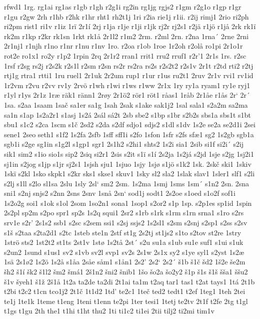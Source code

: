 rfwd1
1rg.
rg1ai
rg1as
r1gb
r1gh
r2g1i
rg2in
rg1jg
rgjs2
r1gm
r2g1o
r1gp
r1gr
r1gu
r2gw
2rh
r1hb
r2hk
r1hr
rht1
rh2t1j
1ri
r2ia
rie1j
r1ii.
r2ij
rimj1
2rio
ri2ph
ri2pm
rist1
ri1v
r1iz
1rï
2r1í
2rj
r1ja
r1je
r1ji
r1jk
rj2r
rj2s1
r2jä
r1jö
r1jå
2rk
rk1ï
rk2m
r1kp
r2kr
rk1sn
1rkt
rk1å
2r1l2
r1m2
2rm.
r2ml
2rn.
r2na
1rna´
2rne
2rni
2r1nj1
r1njh
r1no
r1nr
r1nu
r1nv
1ro.
r2oa
r1ob
1roe
1r2oh
r2olå
ro1pi
2r1o1r
rot2e
ro1x1
ro2y
r1p2
1rpin
2rq
2r1r2
rran1
rrit1
rru2
rruf1
r2r'1
2r1s
1rs.
r2sc
1rsf
r2sg
rs2j
r2s2k
r2s1l
r2sm
r2sn
rs2r
rs2ra
rs2s
r2s2t2
r2s1v
2r1t
r2td
rti2
r2tj
rtj1g
rtra1
rtti1
1ru
ruel1
2r1uk
2r2um
rup1
r1ur
r1us
ru2t1
2ruv
2r1v
rvi1
rv1id
1r2vm
r2vu
r2vv
rv1y
2rvö
r1wh
r1wi
r1ws
r1ww
2r1x
1ry
ry1a
ryam1
ry1e
ryj1
r1yl
r1ys
2r1z
1ræ
räk1
ränn1
2røy
2r1ö2
rör1
röt1
råas1
1råb
2r1åe
r1ås
2r`
2r´
1sa.
s2aa
1saam
1sač
sa1er
sa1g
1sah
2sak
s1ake
sak1j2
1sal
sala1
s2a2m
sa2ma
sa1n
s1ap
1s2a2r1
s1asj
1s2á
2sál
sá2t
2sb
sbe2
s1bp
s1br
s2b2s
sbs1a
sbs1t
s1bt
sbu1
s1c2
s2ca
1scm
s1č
2sd2
s2da
s2df
sdjo1
sdjs2
s1dl
s1dv
1s2e
se2a
se2d1i
2sei
sene1
2seo
seth1
s1f2
1s2fa
2sfb
1sff
sff1i
s2fo
1sfon
1sfr
s2fs
sfæ1
sg2
1s2gb
sgb1a
sgb1i
s2ge
sg1in
s1g2l
s1gp1
sgr1
2s1h2
s2hi1
shts2
1s2i
sia1
2sib
si1f
si2i´
s2ij
sik1
sim2
s1io
sio1s
sip2
2siq
si2r1
2sis
s2it
s1ï
s1í
2s2ja
1s2já
s2jd
1sje
s2jg
1sj2i1
sj1in
s2jog
s1jp
s1jr
sj2s1
1sjsh
sju1
1sjuo
1sjy
1sjø
s1jö
s1k2
1sk.
2skč
ski1
1skiv
1skï
s2kl
1sko
skpk1
s2kr
sks1
skse1
skuv1
1sky
sl2
sla2
1slak
slav1
1sler1
slf1
s2li
s2lj
s1ll
s2lo
sl1sa
2slu
1sly
2sl`
sm2
2sm.
1s2ma
1smj
1sms
1sm´
s1n2
2sn.
2sna
sni1
s2nj
snjs2
s2nn
2sns
2snv
1snå
2sn`
sod1j
sodt1
2s2oe
s1oed
s1o2f
sof1i
1s2o2g
soi1
s1ok
s1ol
2som
1so2n1
sona1
1sop1
s2or2
s1p
1sp.
s2p1es
sp1id
1spin
2s2pl
sp2m
s2po
spr1
sp2s
1s2q
squi1
2sr2
s1rb
s1rk
s1rm
s1rn
srna1
s1ro
s2rs
srv1e
s2r'
2s1s2
ssb1
s2sc
s2sem
ssi1
s2sj
ssjs2
1s2sl1
s2sm
s2snj
s2sp1
s2ss
s2sv
s1š
s2taa
s2ta2d1
s2tc
1steb
ste1n
2stf
st1g
2s2tj
st1js2
s1to
s2tov
st2re
1stry
1strö
sts2
1st2t2
st1ts
2st1v
1stø
1s2tå
2st´
s2u
su1a
s1ub
su1e
suf1
s1ui
s1uk
s2un2
1sund
s1us1
sv2
s1vb
sv2l
svp1
sv2s
2s1w
2s1x
sy2
s1ye
syl1
s2yst
1s2æ
1sä
2s1ø2
1s2ö
1s2å
s1åa
2såe
såm1
s1ån1
2s2'
2s2`
2s2´
š1b
š1č
šd2
1š2e
še2m
šh2
š1í
šk2
š1l2
šm2
šmá1
2š1n2
šni2
šnib1
1šo
šo2a
šo2y2
š1p
š1s
š1š
šša1
ššu2
š1v
šyeh1
š1ž
2š1å
1t2a
ta2de
ta2di
2t1ai
ta1m
t2aq
tar1
tas1
t2at
tays1
1tá
2t1b
t2bi
t2c2
t1cn
tco1j2
2t1č
1t1d2
1td'
te2c1
1teč
ted2
tedt1
t2ef
1teg1
1teh
2tei
te1j
1te1k
1teme
t1eng
1teni
t1enn
te2pi
1ter
tesi1
1tetj
te2tv
2t1f
t2fe
2tg
t1gl
t1gs
t1gu
2th
the1
t1hi
t1ht
thu2
1ti
ti1c2
ti1ei
2tii
tilj2
ti2mi
tim1v
